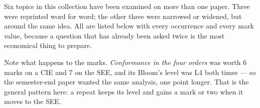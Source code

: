 \documentclass[11pt,a4paper,oneside]{book}
\begin{document}
Six topics in this collection have been examined on more than one paper. Three
were reprinted word for word; the other three were narrowed or widened, but
around the same idea. All are listed below with every occurrence and every
mark value, because a question that has already been asked twice is the most
economical thing to prepare.

\vspace{2pt}
Note what happens to the marks. \emph{Conformance in the four orders} was
worth 6 marks on a CIE and 7 on the SEE, and its Bloom's level was L4 both
times --- so the semester-end paper wanted the same analysis, one point
longer. That is the general pattern here: a repeat keeps its level and gains a
mark or two when it moves to the SEE.

\renewcommand{\arraystretch}{1.35}
\setlength{\LTpre}{8pt}\setlength{\LTpost}{4pt}
\end{document}
